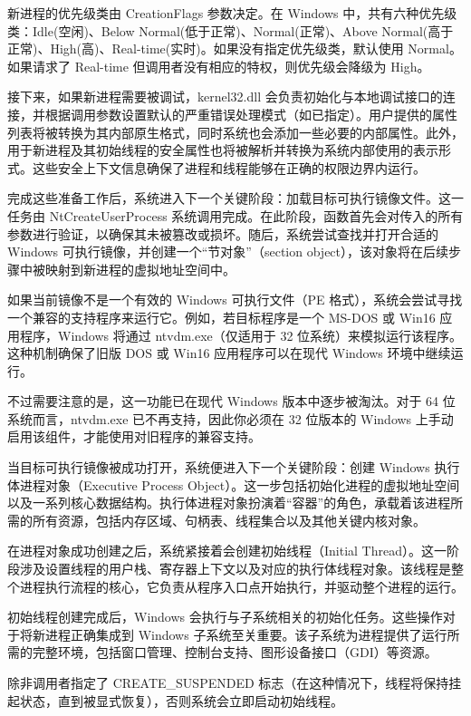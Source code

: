 新进程的优先级类由 CreationFlags 参数决定。在 Windows 中，共有六种优先级类：Idle(空闲)、Below Normal(低于正常)、Normal(正常)、Above Normal(高于正常)、High(高)、Real-time(实时)。如果没有指定优先级类，默认使用 Normal。如果请求了 Real-time 但调用者没有相应的特权，则优先级会降级为 High。

接下来，如果新进程需要被调试，kernel32.dll 会负责初始化与本地调试接口的连接，并根据调用参数设置默认的严重错误处理模式（如已指定）。用户提供的属性列表将被转换为其内部原生格式，同时系统也会添加一些必要的内部属性。此外，用于新进程及其初始线程的安全属性也将被解析并转换为系统内部使用的表示形式。这些安全上下文信息确保了进程和线程能够在正确的权限边界内运行。

完成这些准备工作后，系统进入下一个关键阶段：加载目标可执行镜像文件。这一任务由 NtCreateUserProcess 系统调用完成。在此阶段，函数首先会对传入的所有参数进行验证，以确保其未被篡改或损坏。随后，系统尝试查找并打开合适的 Windows 可执行镜像，并创建一个“节对象”（section object），该对象将在后续步骤中被映射到新进程的虚拟地址空间中。

如果当前镜像不是一个有效的 Windows 可执行文件（PE 格式），系统会尝试寻找一个兼容的支持程序来运行它。例如，若目标程序是一个 MS-DOS 或 Win16 应用程序，Windows 将通过 ntvdm.exe（仅适用于 32 位系统）来模拟运行该程序。这种机制确保了旧版 DOS 或 Win16 应用程序可以在现代 Windows 环境中继续运行。

不过需要注意的是，这一功能已在现代 Windows 版本中逐步被淘汰。对于 64 位系统而言，ntvdm.exe 已不再支持，因此你必须在 32 位版本的 Windows 上手动启用该组件，才能使用对旧程序的兼容支持。

当目标可执行镜像被成功打开，系统便进入下一个关键阶段：创建 Windows 执行体进程对象（Executive Process Object）。这一步包括初始化进程的虚拟地址空间以及一系列核心数据结构。执行体进程对象扮演着“容器”的角色，承载着该进程所需的所有资源，包括内存区域、句柄表、线程集合以及其他关键内核对象。

在进程对象成功创建之后，系统紧接着会创建初始线程（Initial Thread）。这一阶段涉及设置线程的用户栈、寄存器上下文以及对应的执行体线程对象。该线程是整个进程执行流程的核心，它负责从程序入口点开始执行，并驱动整个进程的运行。

初始线程创建完成后，Windows 会执行与子系统相关的初始化任务。这些操作对于将新进程正确集成到 Windows 子系统至关重要。该子系统为进程提供了运行所需的完整环境，包括窗口管理、控制台支持、图形设备接口（GDI）等资源。

除非调用者指定了 CREATE\_SUSPENDED 标志（在这种情况下，线程将保持挂起状态，直到被显式恢复），否则系统会立即启动初始线程。

